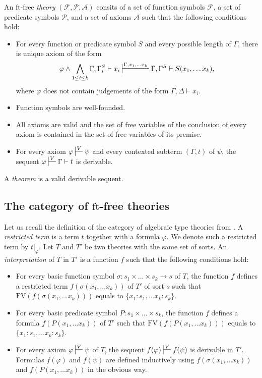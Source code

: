 \documentclass[reqno]{amsart}
\theoremstyle{definition}
\theoremstyle{remark}
\newcommand{\fs}[1]{\mathrm{#1}}
\newcommand{\FV}{\fs{FV}}
\newcommand{\ft}{\fs{ft}}
\numberwithin{figure}{section}
\begin{document}
\begin{defn}[ft-free]
An $\ft$-free \emph{theory} $(\mathcal{F},\mathcal{P},\mathcal{A})$ consits of a set of function symbols $\mathcal{F}$, a set of predicate symbols $\mathcal{P}$, and a set of axioms $\mathcal{A}$ such that the following conditions hold:
\begin{itemize}
\item For every function or predicate symbol $S$ and every possible length of $\Gamma$, there is unique axiom of the form
\[ \varphi \land \bigwedge_{1 \leq i \leq k} \Gamma, \Gamma^S_i \vdash x_i \sststile{}{\Gamma, x_1, \ldots x_k} \Gamma, \Gamma^S \vdash S(x_1, \ldots x_k), \]
where $\varphi$ does not contain judgements of the form $\Gamma, \Delta \vdash x_i$.
\item Function symbols are well-founded.
\item All axioms are valid and the set of free variables of the conclusion of every axiom is contained in the set of free variables of its premise.
\item For every axiom $\varphi \sststile{}{V} \psi$ and every contexted subterm $(\Gamma,t)$ of $\psi$, the sequent $\varphi \sststile{}{V} \Gamma \vdash t$ is derivable.
\end{itemize}
A \emph{theorem} is a valid derivable sequent.
\end{defn}

\subsection{The category of $\ft$-free theories}
\label{sec:types}

Let us recall the definition of the category of algebraic type theories from \cite{alg-tt}.
A \emph{restricted term} is a term $t$ together with a formula $\varphi$.
We denote such a restricted term by $t|_\varphi$.
Let $T$ and $T'$ be two theories with the same set of sorts.
An \emph{interpretation} of $T$ in $T'$ is a function $f$ such that the following conditions hold:
\begin{itemize}
\item For every basic function symbol $\sigma : s_1 \times \ldots \times s_k \to s$ of $T$,
the function $f$ defines a restricted term $f(\sigma(x_1, \ldots x_k))$ of $T'$ of sort $s$ such that $\FV(f(\sigma(x_1, \ldots x_k)))$ equals to $\{ x_1 : s_1, \ldots x_k : s_k \}$.
\item For every basic predicate symbol $P : s_1 \times \ldots \times s_k$,
the function $f$ defines a formula $f(P(x_1, \ldots x_k))$ of $T'$ such that $\FV(f(P(x_1, \ldots x_k)))$ equals to $\{ x_1 : s_1, \ldots x_k : s_k \}$.
\item For every axiom $\varphi \sststile{}{V} \psi$ of $T$, the sequent $f(\varphi) \sststile{}{V} f(\psi)$ is derivable in $T'$.
Formulas $f(\varphi)$ and $f(\psi)$ are defined inductively using $f(\sigma(x_1, \ldots x_k))$ and $f(P(x_1, \ldots x_k))$ in the obvious way.
\end{itemize}
\end{document}
